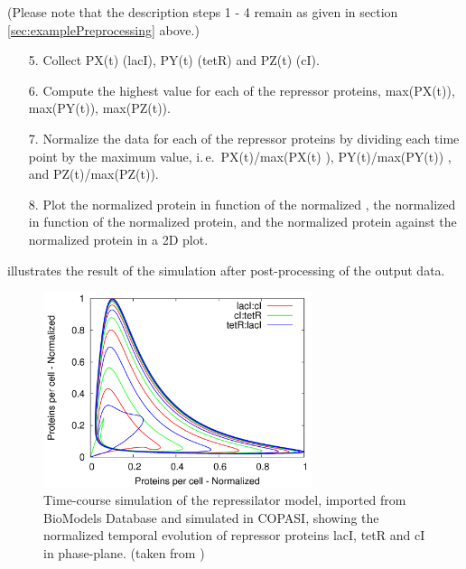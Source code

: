 (Please note that the description steps 1 - 4 remain as given in section \ref{sec:examplePreprocessing} above.)
\begin{enumerate}
\item[5.]{Collect PX(t) (lacI), PY(t) (tetR) and PZ(t) (cI).}
\item[6.]{Compute the highest value for each of the repressor proteins,  max(PX(t)), max(PY(t)), max(PZ(t)).}
\item[7.]{Normalize the data for each of the repressor proteins by dividing each time point by the maximum value, i.\,e.\ PX(t)/max(PX(t) ), PY(t)/max(PY(t)) , and PZ(t)/max(PZ(t)).}
\item[8.]{Plot the normalized  protein in function of the normalized , the normalized  in function of the normalized  protein, and the normalized  protein against the normalized  protein in a 2D plot.}
\end{enumerate}
 illustrates the result of the simulation after post-processing of the output data. 
\begin{figure}
\centering
\includegraphics[width=0.7\textwidth]{images/simEx2.png}
\caption{Time-course simulation of the repressilator model, imported from BioModels Database and simulated in COPASI, showing the normalized temporal evolution of repressor proteins lacI, tetR and cI in phase-plane. (taken from \cite{Waltemath:2010})}
\label{fig:simEx2}
\end{figure}


